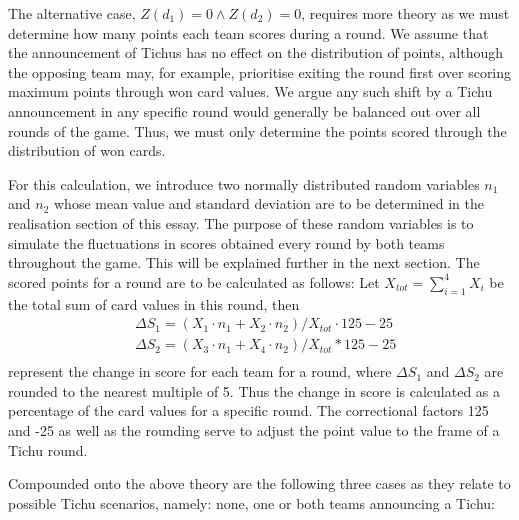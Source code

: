 The alternative case, $Z(d_1) = 0 \land Z(d_2) = 0$, requires more theory as we must determine how many points each team scores during a round. We assume that the announcement of Tichus has no effect on the distribution of points, although the opposing team may, for example, prioritise exiting the round first over scoring maximum points through won card values. We argue any such shift by a Tichu announcement in any specific round would generally be balanced out over all rounds of the game. Thus, we must only determine the points scored through the distribution of won cards.

For this calculation, we introduce two normally distributed random variables $n_1$ and $n_2$ whose mean value and standard deviation are to be determined in the realisation section of this essay. The purpose of these random variables is to simulate the fluctuations in scores obtained every round by both teams throughout the game. This will be explained further in the next section. The scored points for a round are to be calculated as follows: Let $X_{tot} = \sum_{i=1}^{4} X_i$ be the total sum of card values in this round, then
\begin{align*}
    &\Delta S_1 = (X_1\cdot n_1 + X_2\cdot n_2)/ X_{tot} \cdot 125 - 25\\
    &\Delta S_2 = (X_3\cdot n_1 + X_4\cdot n_2)/ X_{tot} * 125 - 25\\
\end{align*}
represent the change in score for each team for a round, where $\Delta S_1$ and $\Delta S_2$ are rounded to the nearest multiple of 5. Thus the change in score is calculated as a percentage of the card values for a specific round. The correctional factors 125 and -25 as well as the rounding serve to adjust the point value to the frame of a Tichu round.

Compounded onto the above theory are the following three cases as they relate to possible Tichu scenarios, namely: none, one or both teams announcing a Tichu:

